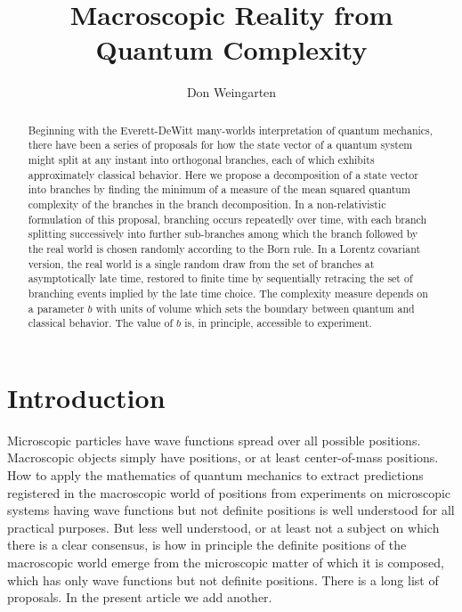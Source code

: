 \documentclass[twocolumn,amsmath,amssymb]{revtex4-1}
\begin{document}
\title{Macroscopic Reality from Quantum Complexity}
\author{Don Weingarten}

\begin{abstract}
Beginning with the Everett-DeWitt many-worlds interpretation of quantum mechanics, there have
been a series of proposals for how the state vector of a quantum system might split at any instant
into orthogonal branches, each of which exhibits approximately classical behavior.
Here we propose a decomposition of a state vector into branches 
by finding the minimum of a measure of the mean squared quantum complexity of the branches in the branch 
decomposition. 
In a non-relativistic formulation of this proposal, branching occurs repeatedly over time,
with each branch splitting successively into further sub-branches among which
the branch followed by the real world is chosen randomly according to the Born rule.
In a Lorentz covariant version,
the real world is a single random draw from 
the set of branches at asymptotically late time,
restored to finite time
by sequentially retracing the set of branching 
events implied by the late time choice.
The complexity measure depends on a parameter $b$ with units of volume which
sets the boundary between quantum and classical behavior. 
The value of $b$ is, in principle, accessible to experiment.
\end{abstract}

\maketitle
\section{\label{sec:intro}Introduction}

Microscopic particles have wave functions spread over all possible positions. 
Macroscopic objects simply have positions, or at least center-of-mass positions.
How to apply the mathematics of quantum mechanics to extract predictions 
registered in the macroscopic world of positions 
from experiments on microscopic systems having wave functions but not definite positions 
is well understood for all practical purposes.
But less well understood, or at least not a subject on which there is a clear consensus, is 
how in principle the definite positions of the macroscopic world emerge from the microscopic 
matter of which it is composed, which has only wave functions but not definite positions.
There is a long list of proposals.
In the present article we add another.  
\end{document}
